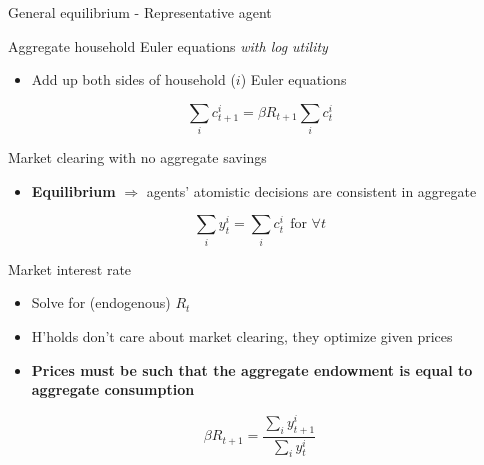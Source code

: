 
\begin{frame}{General equilibrium - Representative agent}

Aggregate household Euler equations \emph{with log utility}
	\begin{itemize}
	\item	Add up both sides of household ($i$) Euler equations
	\end{itemize}
\begin{equation*}
\sum_{i}c_{t+1}^{i}=\beta R_{t+1}\sum_{i}c_{t}^{i}
\end{equation*}

Market clearing with no aggregate savings
\begin{itemize}
\item	\textbf{Equilibrium} $\Rightarrow$ agents' atomistic decisions are consistent in aggregate
\end{itemize}
\begin{equation*}
\sum_{i}y_{t}^{i}=\sum_{i}c_{t}^{i}\ \ \text{for }\forall t
\end{equation*}

Market interest rate
\begin{itemize}
\item	Solve for (endogenous) $R_{t}$
\item	H'holds don't care about market clearing, they optimize given prices
\item	\textbf{Prices must be such that the aggregate endowment is equal to aggregate consumption}
\end{itemize}
\begin{equation*}
\beta R_{t+1}=\frac{\sum_{i}y_{t+1}^{i}}{\sum_{i}y_{t}^{i}}
\end{equation*}

\end{frame}


